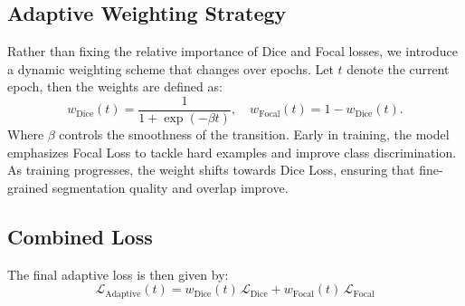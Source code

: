 \subsection{Adaptive Weighting Strategy}

Rather than fixing the relative importance of Dice and Focal losses, we introduce a dynamic weighting scheme that changes over epochs. Let $t$ denote the current epoch, then the weights are defined as:
\begin{equation}
    w_{\text{Dice}}(t) = \frac{1}{1 + \exp(-\beta t)},
    \quad
    w_{\text{Focal}}(t) = 1 - w_{\text{Dice}}(t).
\end{equation}
Where $\beta$ controls the smoothness of the transition. Early in training, the model emphasizes Focal Loss to tackle hard examples and improve class discrimination. As training progresses, the weight shifts towards Dice Loss, ensuring that fine-grained segmentation quality and overlap improve.

\subsection{Combined Loss}

The final adaptive loss is then given by:
\begin{equation}
    \mathcal{L}_{\text{Adaptive}}(t) =
    w_{\text{Dice}}(t)\, \mathcal{L}_{\text{Dice}}
    +
    w_{\text{Focal}}(t)\, \mathcal{L}_{\text{Focal}}
\end{equation}
